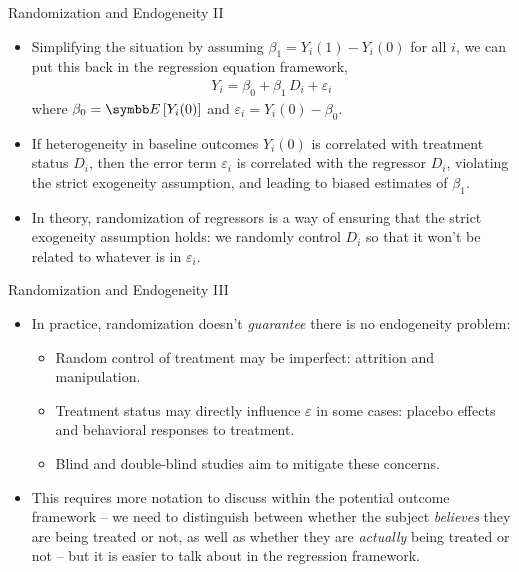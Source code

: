 \documentclass[aspectratio=169,11pt]{beamer}
\begin{document}
\begin{frame}{Randomization and Endogeneity II}
\begin{itemize}
  \item Simplifying the situation by assuming $\beta_1=Y_{i}(1)-Y_{i}(0)$ for all
$i$, we can put this back in the regression equation framework,
\begin{align*}
Y_{i}=\beta_{0}+\beta_{1}\, D_{i}+\varepsilon_{i}
\end{align*}
where $\beta_{0}=\E\left[Y_{i}(0)\right]$ and $\varepsilon_{i}=Y_{i}(0)-\beta_{0}$.

  \medskip
  \item If heterogeneity in baseline outcomes  $Y_{i}(0)$  is correlated with treatment status $D_i$,
  then the error term $\varepsilon_{i}$ is correlated with the regressor $D_i$,
  violating the strict exogeneity assumption, and leading to biased estimates of $\beta_1$.

  \medskip
  \item In theory, randomization of regressors is a way of ensuring that the strict exogeneity assumption holds:
  we randomly control $D_i$ so that it won't be related to whatever is in $\varepsilon_i$.
\end{itemize}
\end{frame}

\begin{frame}{Randomization and Endogeneity III}
\begin{itemize}
  \item In practice, randomization doesn't \emph{guarantee} there is no endogeneity problem:
  \begin{itemize}
    \item Random control of treatment may be imperfect: attrition and manipulation.
    \item Treatment status may directly influence $\varepsilon$ in some cases: placebo effects 
      and behavioral responses to treatment. 
    \item Blind and double-blind studies aim to mitigate these concerns.
  \end{itemize}
    
\medskip
  \item This requires more notation to discuss within the potential outcome framework -- we need to distinguish
  between whether the subject \emph{believes} they are being treated or not, as well as whether they are \emph{actually}
  being treated or not -- but it is easier to talk about in the regression framework. 
\end{itemize}
\end{frame}
\end{document}
